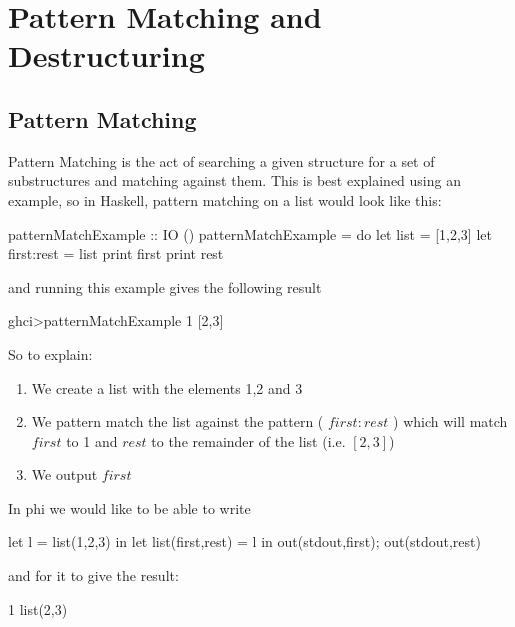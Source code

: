 \section{Pattern Matching and Destructuring}
\label{sec:patterns}

\subsection{Pattern Matching}
Pattern Matching is the act of searching a given structure for a set of substructures and matching against them. This is best explained using an example, so in Haskell, pattern matching on a list would look like this:

\label{example:pmatchhask}
\begin{code}
patternMatchExample :: IO ()
patternMatchExample = do
        let list = [1,2,3]
        let first:rest = list
        print first
        print rest
\end{code}
and running this example gives the following result
\begin{code}
    ghci>patternMatchExample 
    1
    [2,3]
\end{code}

So to explain:
\begin{enumerate}
    \item We create a list with the elements 1,2 and 3
    \item We pattern match the list against the pattern ( $first:rest$ ) which will match $first$ to 1 and $rest$ to the remainder of the list (i.e. $[2,3]$)
    \item We output $first$
\end{enumerate}

In phi we would like to be able to write

\begin{code}
let l = list(1,2,3) in
    let list(first,rest) = l in
        out(stdout,first);
        out(stdout,rest)
\end{code}

and for it to give the result:

\begin{code}
    1
    list(2,3)
\end{code}

